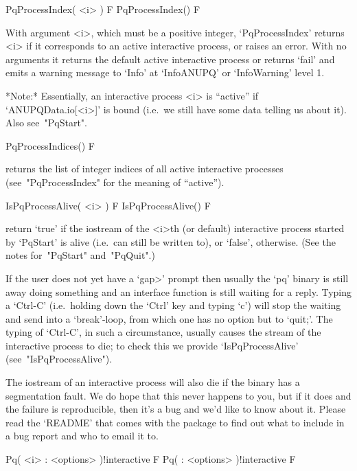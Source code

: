 \>PqProcessIndex( <i> ) F
\>PqProcessIndex() F

With argument <i>, which must be  a  positive  integer,  `PqProcessIndex'
returns <i> if it corresponds to an active interactive process, or raises
an error. With no arguments it returns  the  default  active  interactive
process or returns `fail' and  emits  a  warning  message  to  `Info'  at
`InfoANUPQ' or `InfoWarning' level 1.

*Note:*
Essentially,  an  interactive  {\ANUPQ}  process  <i>  is  ``active''  if
`ANUPQData.io[<i>]' is bound (i.e.~we still have  some  data  telling  us
about it). Also see~"PqStart".

\>PqProcessIndices() F

returns the list of integer indices of all  active  interactive  {\ANUPQ}
processes (see~"PqProcessIndex" for the meaning of ``active'').

\>IsPqProcessAlive( <i> ) F
\>IsPqProcessAlive() F

return  `true'  if  the  {\GAP}  iostream  of  the  <i>th  (or   default)
interactive {\ANUPQ} process started  by  `PqStart'  is  alive  (i.e.~can
still be written to), or `false', otherwise. (See the notes for~"PqStart"
and~"PqQuit".)

If the user does not yet have a  `gap>'  prompt  then  usually  the  `pq'
binary is still away doing something and an {\ANUPQ}  interface  function
is still waiting for a reply. Typing a `Ctrl-C'  (i.e.~holding  down  the
`Ctrl' key and typing `c') will stop the waiting and send {\GAP}  into  a
`break'-loop, from which one has no option but to `quit;'. The typing  of
`Ctrl-C', in such a  circumstance,  usually  causes  the  stream  of  the
interactive  {\ANUPQ}  process  to  die;  to  check   this   we   provide
`IsPqProcessAlive' (see~"IsPqProcessAlive").

The {\GAP} iostream of an interactive {\ANUPQ} process will also  die  if
the {\ANUPQ} binary has a segmentation fault. We do hope that this  never
happens to you, but if it does and the failure is reproducible, then it's
a bug and we'd like to know about it. Please read the `README' that comes
with the {\ANUPQ} package to find out what to include in a bug report and
who to email it to.


\>Pq( <i> : <options> )!{interactive} F
\>Pq( : <options> )!{interactive} F

